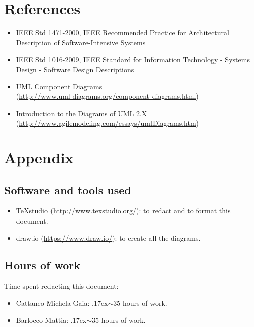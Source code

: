 \documentclass[18pt,oneside,a4paper, titlepage]{article}
\begin{document}
	\section{References}
		\begin{itemize}
			\item IEEE Std 1471-2000, IEEE Recommended Practice for
			Architectural Description of Software-Intensive Systems
			\item IEEE Std 1016-2009, IEEE Standard for Information
			Technology - Systems Design - Software Design Descriptions
			\item UML Component Diagrams\\ (\url{http://www.uml-diagrams.org/component-diagrams.html})
			\item Introduction to the Diagrams of UML 2.X \\(\url{http://www.agilemodeling.com/essays/umlDiagrams.htm})
		\end{itemize}
\newpage
	\section{Appendix}
		\subsection{Software and tools used}
				\begin{itemize}
					\item TeXstudio (\url{http://www.texstudio.org/}): to redact and to format this document.
					\item draw.io (\url{https://www.draw.io/}): to create all the diagrams.
				\end{itemize}
		\subsection{Hours of work}
			Time spent redacting this document:
			\begin{itemize}
				\item Cattaneo Michela Gaia: {\raise.17ex\hbox{$\scriptstyle\sim$}}35 hours of work.
				\item Barlocco Mattia: {\raise.17ex\hbox{$\scriptstyle\sim$}}35 hours of work.
			\end{itemize}
		
		
		
\end{document}
